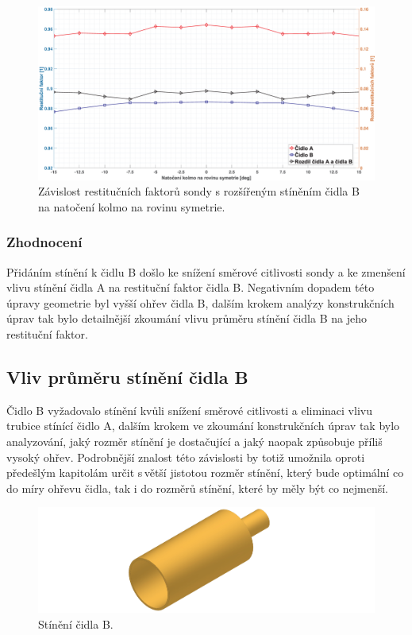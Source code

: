              \begin{figure}[ht!]
                \centering
                \includegraphics*[width=\textwidth]{400_SIMULACE_KONSTRUKCNICH_UPRAV/Grafy/03_kolma_rovina}
                \caption{Závislost restitučních faktorů sondy s rozšířeným stíněním čidla B na natočení kolmo na rovinu symetrie.}
                \label{fig:sonda-s-rosirenym-stinenim-kolma-rovina}
            \end{figure}

        \subsubsection{Zhodnocení}
            Přidáním stínění k čidlu B došlo ke snížení směrové citlivosti sondy a ke zmenšení vlivu stínění čidla A na restituční faktor čidla B. Negativním dopadem této úpravy geometrie byl vyšší ohřev čidla B, dalším krokem analýzy konstrukčních úprav tak bylo detailnější zkoumání vlivu průměru stínění čidla B na jeho restituční faktor.
    
    \newpage
    \subsection{Vliv průměru stínění čidla B}
        Čidlo B vyžadovalo stínění kvůli snížení směrové citlivosti a eliminaci vlivu trubice stínící čidlo A, dalším krokem ve zkoumání konstrukčních úprav tak bylo analyzování, jaký rozměr stínění je dostačující a jaký naopak způsobuje příliš vysoký ohřev. Podrobnější znalost této závislosti by totiž umožnila oproti předešlým kapitolám určit s\,větší jistotou rozměr stínění, který bude optimální co do míry ohřevu čidla, tak i do rozměrů stínění, které by měly být co nejmenší. 
        \begin{figure}[ht!]
            \centering
            \includegraphics[width=\textwidth]{400_SIMULACE_KONSTRUKCNICH_UPRAV/Vykresy_rendery/Stineni_B.png}
            \caption{Stínění čidla B.}
            \label{fig:stineni-B}
        \end{figure}

